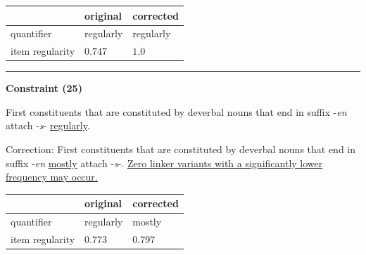 \vspace{-0.25em}

\begin{table}[!ht]

\begin{center}

\begin{tabularx}{\columnwidth}{|X|X|X|}
      \hline
                        & original      & corrected \\
      \hline
      quantifier        & regularly      & regularly   \\
      \hline
      item regularity   & $0.747$      & $1.0$   \\
      \hline
\end{tabularx}
\end{center}
\end{table}

\vspace{-0.75em}
\hrule




\vspace{0.6em}

\begin{center}
\textbf{Constraint (25)}
\end{center}

\noindent
First constituents that are constituted by deverbal nouns that end in suffix -\textit{en} attach -\textit{s}- \underline{regularly}.
\vspace{0.3em}

\noindent
Correction: First constituents that are constituted by deverbal nouns that end in suffix -\textit{en} \underline{mostly} attach -\textit{s}-. \underline{Zero linker variants with a significantly lower} \underline{frequency may occur.}

\vspace{-0.25em}

\begin{table}[!ht]

\begin{center}

\begin{tabularx}{\columnwidth}{|X|X|X|}
      \hline
                        & original      & corrected \\
      \hline
      quantifier        & regularly      & mostly   \\
      \hline
      item regularity   & $0.773$      & $0.797$   \\
      \hline
\end{tabularx}
\end{center}
\end{table}

